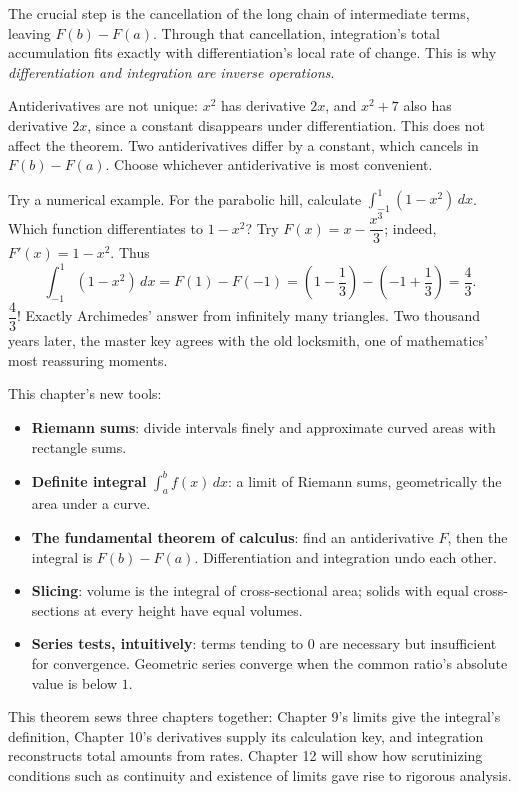 The crucial step is the cancellation of the long chain of intermediate terms, leaving $F(b)-F(a)$. Through that cancellation, integration's total accumulation fits exactly with differentiation's local rate of change. This is why \emph{differentiation and integration are inverse operations}.

\begin{zhu}
Antiderivatives are not unique: $x^{2}$ has derivative $2x$, and $x^{2}+7$ also has derivative $2x$, since a constant disappears under differentiation. This does not affect the theorem. Two antiderivatives differ by a constant, which cancels in $F(b)-F(a)$. Choose whichever antiderivative is most convenient.
\end{zhu}

Try a numerical example. For the parabolic hill, calculate $\int_{-1}^{1}(1-x^{2})\,dx$. Which function differentiates to $1-x^{2}$? Try $F(x)=x-\dfrac{x^{3}}{3}$; indeed, $F'(x)=1-x^{2}$. Thus
\[
\int_{-1}^{1}(1-x^{2})\,dx=F(1)-F(-1)=\left(1-\frac13\right)-\left(-1+\frac13\right)=\frac43 .
\]
$\dfrac43$! Exactly Archimedes' answer from infinitely many triangles. Two thousand years later, the master key agrees with the old locksmith, one of mathematics' most reassuring moments.

\begin{toolbox}
This chapter's new tools:
\begin{itemize}
  \item \textbf{Riemann sums}: divide intervals finely and approximate curved areas with rectangle sums.
  \item \textbf{Definite integral} $\int_a^b f(x)\,dx$: a limit of Riemann sums, geometrically the area under a curve.
  \item \textbf{The fundamental theorem of calculus}: find an antiderivative $F$, then the integral is $F(b)-F(a)$. Differentiation and integration undo each other.
  \item \textbf{Slicing}: volume is the integral of cross-sectional area; solids with equal cross-sections at every height have equal volumes.
  \item \textbf{Series tests, intuitively}: terms tending to $0$ are necessary but insufficient for convergence. Geometric series converge when the common ratio's absolute value is below $1$.
\end{itemize}
\end{toolbox}

\begin{lianjie}
This theorem sews three chapters together: Chapter 9's limits give the integral's definition, Chapter 10's derivatives supply its calculation key, and integration reconstructs total amounts from rates. Chapter 12 will show how scrutinizing conditions such as continuity and existence of limits gave rise to rigorous analysis.
\end{lianjie}

